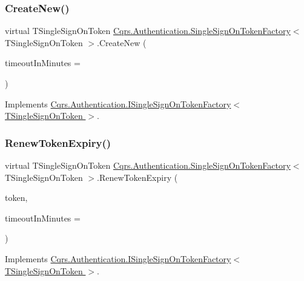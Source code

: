 \subsubsection{\texorpdfstring{Create\+New()}{CreateNew()}}
{\footnotesize\ttfamily virtual T\+Single\+Sign\+On\+Token \hyperlink{classCqrs_1_1Authentication_1_1SingleSignOnTokenFactory}{Cqrs.\+Authentication.\+Single\+Sign\+On\+Token\+Factory}$<$ T\+Single\+Sign\+On\+Token $>$.Create\+New (\begin{DoxyParamCaption}\item[{int}]{timeout\+In\+Minutes = {} }\end{DoxyParamCaption})\hspace{0.3cm}{\ttfamily [virtual]}}



Implements \hyperlink{interfaceCqrs_1_1Authentication_1_1ISingleSignOnTokenFactory_ad0795fb60ca13dd24db18556089e2834}{Cqrs.\+Authentication.\+I\+Single\+Sign\+On\+Token\+Factory$<$ T\+Single\+Sign\+On\+Token $>$}.

\mbox{\label{classCqrs_1_1Authentication_1_1SingleSignOnTokenFactory_a699ceac65874b8319d2e26fa88f554be}} 
\subsubsection{\texorpdfstring{Renew\+Token\+Expiry()}{RenewTokenExpiry()}}
{\footnotesize\ttfamily virtual T\+Single\+Sign\+On\+Token \hyperlink{classCqrs_1_1Authentication_1_1SingleSignOnTokenFactory}{Cqrs.\+Authentication.\+Single\+Sign\+On\+Token\+Factory}$<$ T\+Single\+Sign\+On\+Token $>$.Renew\+Token\+Expiry (\begin{DoxyParamCaption}\item[{T\+Single\+Sign\+On\+Token}]{token,  }\item[{int}]{timeout\+In\+Minutes = {} }\end{DoxyParamCaption})\hspace{0.3cm}{\ttfamily [virtual]}}



Implements \hyperlink{interfaceCqrs_1_1Authentication_1_1ISingleSignOnTokenFactory_ab436004ad1631140f7a58927cbacd8c4}{Cqrs.\+Authentication.\+I\+Single\+Sign\+On\+Token\+Factory$<$ T\+Single\+Sign\+On\+Token $>$}.

